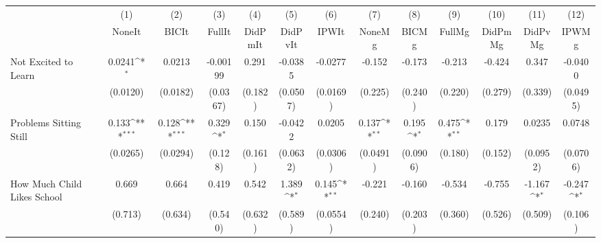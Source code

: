 {
\def\sym#1{\ifmmode^{#1}\else\(^{#1}\)\fi}
\begin{tabular}{l*{12}{c}}
\toprule
            &\multicolumn{1}{c}{(1)}&\multicolumn{1}{c}{(2)}&\multicolumn{1}{c}{(3)}&\multicolumn{1}{c}{(4)}&\multicolumn{1}{c}{(5)}&\multicolumn{1}{c}{(6)}&\multicolumn{1}{c}{(7)}&\multicolumn{1}{c}{(8)}&\multicolumn{1}{c}{(9)}&\multicolumn{1}{c}{(10)}&\multicolumn{1}{c}{(11)}&\multicolumn{1}{c}{(12)}\\
            &\multicolumn{1}{c}{NoneIt}&\multicolumn{1}{c}{BICIt}&\multicolumn{1}{c}{FullIt}&\multicolumn{1}{c}{DidPmIt}&\multicolumn{1}{c}{DidPvIt}&\multicolumn{1}{c}{IPWIt}&\multicolumn{1}{c}{NoneMg}&\multicolumn{1}{c}{BICMg}&\multicolumn{1}{c}{FullMg}&\multicolumn{1}{c}{DidPmMg}&\multicolumn{1}{c}{DidPvMg}&\multicolumn{1}{c}{IPWMg}\\
\midrule
Not Excited to Learn&      0.0241\sym{*}  &      0.0213         &    -0.00199         &       0.291         &     -0.0385         &     -0.0277         &      -0.152         &      -0.173         &      -0.213         &      -0.424         &       0.347         &     -0.0400         \\
            &    (0.0120)         &    (0.0182)         &    (0.0367)         &     (0.182)         &    (0.0507)         &    (0.0169)         &     (0.225)         &     (0.240)         &     (0.220)         &     (0.279)         &     (0.339)         &    (0.0495)         \\
\addlinespace
Problems Sitting Still&       0.133\sym{***}&       0.128\sym{***}&       0.329\sym{*}  &       0.150         &     -0.0422         &      0.0205         &       0.137\sym{**} &       0.195\sym{*}  &       0.475\sym{**} &       0.179         &      0.0235         &      0.0748         \\
            &    (0.0265)         &    (0.0294)         &     (0.128)         &     (0.161)         &    (0.0632)         &    (0.0306)         &    (0.0491)         &    (0.0906)         &     (0.180)         &     (0.152)         &    (0.0952)         &    (0.0706)         \\
\addlinespace
How Much Child Likes School&       0.669         &       0.664         &       0.419         &       0.542         &       1.389\sym{*}  &       0.145\sym{**} &      -0.221         &      -0.160         &      -0.534         &      -0.755         &      -1.167\sym{*}  &      -0.247\sym{*}  \\
            &     (0.713)         &     (0.634)         &     (0.540)         &     (0.632)         &     (0.589)         &    (0.0554)         &     (0.240)         &     (0.203)         &     (0.360)         &     (0.526)         &     (0.509)         &     (0.106)         \\

\end{tabular}}
